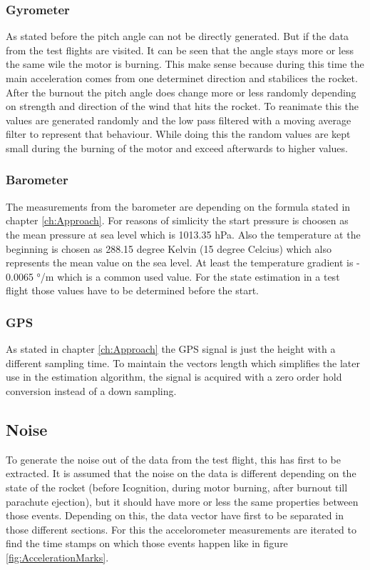 \subsubsection{Gyrometer}
As stated before the pitch angle can not be directly generated.
But if the  data from the test flights are visited. It can be seen that the angle stays more or less the same wile the motor is burning.
This make sense because during this time the main acceleration comes from one determinet direction and stabilices the rocket.
After the burnout the pitch angle does change more or less randomly depending on strength and direction of the wind that hits the rocket.
To reanimate this the values are generated randomly and the low pass filtered with a moving average filter to represent that behaviour.
While doing this the random values are kept small during the burning of the motor and exceed afterwards to higher values.

\subsubsection{Barometer}
The measurements from the barometer are depending on the formula stated in chapter \ref{ch:Approach}.
For reasons of simlicity the start pressure is choosen as the mean pressure at sea level which is 1013.35 hPa.
Also the temperature at the beginning is chosen as 288.15 degree Kelvin (15 degree Celcius) which also represents the mean value on the sea level.
At least the temperature gradient is - 0.0065 °/m which is a common used value.
For the state estimation in a test flight those values have to be determined before the start.

\subsubsection{GPS}
As stated in chapter \ref{ch:Approach} the GPS signal is just the height with a different sampling time. 
To maintain the vectors length which simplifies the later use in the estimation algorithm,
the signal is acquired with a zero order hold conversion instead of a down sampling. 


\subsection{Noise}
To generate the noise out of the data from the test flight, this has first to be extracted.
It is assumed that the noise on the data is different depending on the state of the rocket (before Icognition, during motor burning, after burnout till parachute ejection),
but it should have more or less the same properties between those events.
Depending on this, the data vector have first to be separated in those different sections.
For this the accelorometer measurements are iterated to find the time stamps on which those events happen like in figure \ref{fig:AccelerationMarks}.

